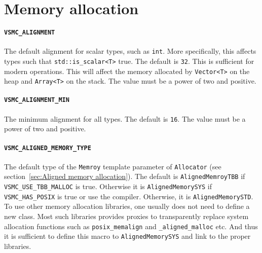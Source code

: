 \section{Memory allocation}
\label{sec:Memory allocation}

\paragraph{\texttt{VSMC\_ALIGNMENT}} The default alignment for scalar types,
such as \verb|int|. More specifically, this affects types such that
\verb|std::is_scalar<T>| true. The default is \verb|32|. This is sufficient for
modern \simd operations. This will affect the memory allocated by
\verb|Vector<T>| on the heap and \verb|Array<T>| on the stack. The value must
be a power of two and positive.

\paragraph{\texttt{VSMC\_ALIGNMENT\_MIN}} The minimum alignment for all types.
The default is \verb|16|. The value must be a power of two and positive.

\paragraph{\texttt{VSMC\_ALIGNED\_MEMORY\_TYPE}} The default type of the
\verb|Memroy| template parameter of \verb|Allocator| (see
section~\ref{sec:Aligned memory allocation}). The default is
\verb|AlignedMemroyTBB| if \verb|VSMC_USE_TBB_MALLOC| is true. Otherwise it is
\verb|AlignedMemorySYS| if \verb|VSMC_HAS_POSIX| is true or use the \msvc
compiler. Otherwise, it is \verb|AlignedMemorySTD|. To use other memory
allocation libraries, one usually does not need to define a new class. Most
such libraries provides proxies to transparently replace system allocation
functions such as \verb|posix_memalign| and \verb|_aligned_malloc| etc. And
thus it is sufficient to define this macro to \verb|AlignedMemorySYS| and link
to the proper libraries.

